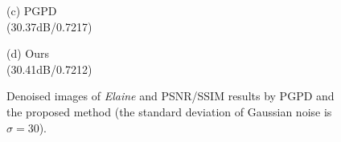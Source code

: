 \documentclass[runningheads]{llncs}
\begin{document}
\begin{figure}
{\begin{minipage}[t]{0.244\textwidth}
{\footnotesize (c) PGPD \\(30.37dB/0.7217)}
\end{minipage}
\begin{minipage}[t]{0.244\textwidth}
\centering
{}
{\footnotesize (d) Ours \\(30.41dB/0.7212)}
\end{minipage}
}\vspace{-0.1in}
\caption{Denoised images of \textsl{Elaine} and PSNR/SSIM results by PGPD and the proposed method (the standard deviation of Gaussian noise is $\sigma=30$).}
\label{fig23}
\end{figure}
\end{document}
